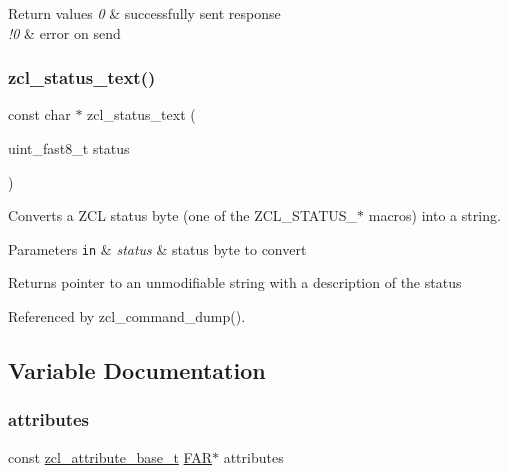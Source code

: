 \begin{DoxyRetVals}{Return values}
{\em 0} & successfully sent response \\
\hline
{\em !0} & error on send \\
\hline
\end{DoxyRetVals}
\mbox{\label{group__zcl_ga04c32f1b9f6c36fae06e9bed5bd8f7dd}} 
\subsubsection{\texorpdfstring{zcl\+\_\+status\+\_\+text()}{zcl\_status\_text()}}
{\footnotesize\ttfamily const char $\ast$ zcl\+\_\+status\+\_\+text (\begin{DoxyParamCaption}\item[{uint\+\_\+fast8\+\_\+t}]{status }\end{DoxyParamCaption})}



Converts a Z\+CL status byte (one of the Z\+C\+L\+\_\+\+S\+T\+A\+T\+U\+S\+\_\+$\ast$ macros) into a string. 


\begin{DoxyParams}[1]{Parameters}
\mbox{\tt in}  & {\em status} & status byte to convert\\
\hline
\end{DoxyParams}
\begin{DoxyReturn}{Returns}
pointer to an unmodifiable string with a description of the status 
\end{DoxyReturn}


Referenced by zcl\+\_\+command\+\_\+dump().



\subsection{Variable Documentation}
\mbox{\label{group__zcl_ga04c31df34f50e8dd1efaf1105631b2bc}} 
\subsubsection{\texorpdfstring{attributes}{attributes}}
{\footnotesize\ttfamily const \hyperlink{structzcl__attribute__base__t}{zcl\+\_\+attribute\+\_\+base\+\_\+t} \hyperlink{group__hal_gaef060b3456fdcc093a7210a762d5f2ed}{F\+AR}$\ast$ attributes}




